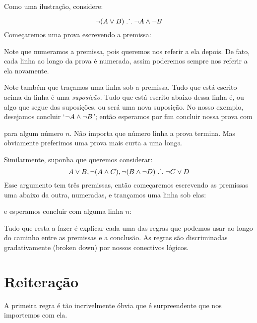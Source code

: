 Como uma ilustra\c c\~ao, considere: 
 
	$$\neg (A \vee B) \mathrel{\ldotp\dot{}\,\ldotp} \neg A \wedge \neg B$$
Come\c caremos uma prova escrevendo a premissa: 
\begin{fitchproof}
\end{fitchproof}
 
Note que numeramos a premissa, pois queremos nos referir  a ela depois. De fato, cada  linha  ao longo da prova  \'e numerada, assim poderemos sempre nos referir a ela novamente. 

 Note tamb\'em que tra\c camos  uma linha sob a  premissa. Tudo que est\'a escrito acima da linha \'e uma 
\emph{suposi\c c\~ao}.  Tudo que est\'a escrito abaixo dessa linha \'e, ou algo que segue das suposi\c c\~oes, ou ser\'a uma nova suposi\c c\~ao.   No nosso exemplo, desejamos concluir 
 `$\neg A \wedge \neg B$';  ent\~ao esperamos por fim concluir nossa prova com
\begin{fitchproof}
\end{fitchproof}
para algum n\'umero $n$.  N\~ao importa que n\'umero linha a  prova termina. Mas obviamente preferimos uma prova mais curta a  uma longa. 

Similarmente,  suponha que queremos considerar:
$$A\vee B, \neg (A\wedge C), \neg (B \wedge \neg D) \mathrel{\ldotp\dot{}\,\ldotp} \neg C\vee D$$
Esse argumento tem tr\^es premissas, ent\~ao  come\c caremos escrevendo as premissas uma abaixo da outra, numeradas, e tran\c camos uma linha sob elas: 
\begin{fitchproof}
\end{fitchproof}
e esperamos concluir com alguma linha $n$:
\begin{fitchproof}
\end{fitchproof}
  Tudo que resta a fazer \'e explicar cada uma das regras que podemos usar ao longo do caminho entre as premissas e a conclus\~ao.  As regras s\~ao  discriminadas gradativamente  (broken down) por nossos conectivos l\'ogicos. 

\section{Reitera\c c\~ao}
 A primeira regra \'e t\~ao incrivelmente \'obvia que \'e surpreendente que nos importemos com ela.

